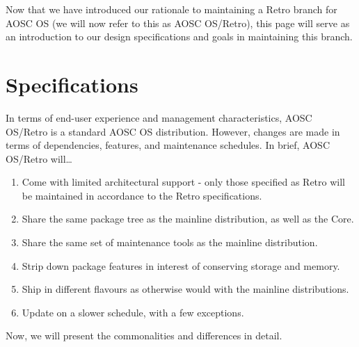 


    \baselineskip=15pt
    \sloppy
    \raggedbottom
    \RaggedRight
    \overfullrule=10pt

    \makecoverpage

    \setcounter{tocdepth}{1}
    \sffamily{\tableofcontents}
    \clearpage

    \hspace{40mm}

    \large
    \vspace{40mm}
    Now that we have introduced our rationale to maintaining a Retro branch for AOSC OS
    (we will now refer to this as AOSC OS/Retro), this page will serve as an introduction
    to our design specifications and goals in maintaining this branch.
    \vfill

    \pagestyle{plain}
    \rmfamily\mdseries\normalsize

    \chapter{Specifications}

    In terms of end-user experience and management characteristics, AOSC OS/Retro is a standard AOSC OS distribution.
    However, changes are made in terms of dependencies, features, and maintenance schedules. In brief, AOSC OS/Retro will\ldots

    \begin{enumerate}
        \item Come with limited architectural support - only those specified
            as Retro will be maintained in accordance to the Retro specifications.
        \item Share the same package tree as the mainline distribution, as well as the Core.
        \item Share the same set of maintenance tools as the mainline distribution.
        \item Strip down package features in interest of conserving storage and memory.
        \item Ship in different flavours as otherwise would with the mainline distributions.
        \item Update on a slower schedule, with a few exceptions.
    \end{enumerate}

    Now, we will present the commonalities and differences in detail.




